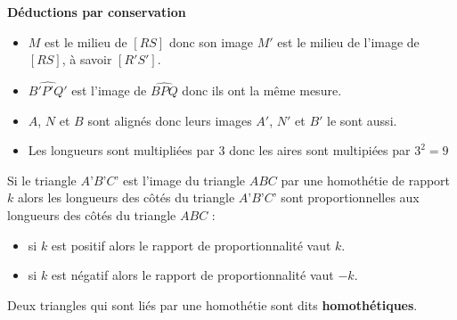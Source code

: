 \begin{exemple*1}
    {\color{red}\bfseries Déductions par conservation}

    \begin{itemize}
        \item $M$ est le milieu de $[RS]$ donc son image $M'$ est le milieu de l'image de $[RS]$, à savoir $[R'S']$.
        \item $\widehat{B'P'Q'}$ est l'image de $\widehat{BPQ}$ donc ils ont la même mesure.
        \item $A$, $N$ et $B$ sont alignés donc leurs images $A'$, $N'$ et $B'$ le sont aussi.
        \item Les longueurs sont multipliées par $3$ donc les aires sont multipiées par $3^2=9$
    \end{itemize}
\end{exemple*1}

\begin{propriete}[\admise]
    Si le triangle $A’B’C’$ est l’image du triangle $ABC$ par une homothétie de rapport $k$ alors les longueurs des côtés du triangle $A’B’C’$ sont proportionnelles aux longueurs des côtés du triangle $ABC$ :
    \begin{itemize}
        \item si $k$ est positif alors le rapport de proportionnalité vaut $k$.
        \item si $k$ est négatif alors le rapport de proportionnalité vaut $-k$.
    \end{itemize}
\end{propriete}

\begin{remarque}
    Deux triangles qui sont liés par une homothétie sont dits \textbf{homothétiques}.

\end{remarque}